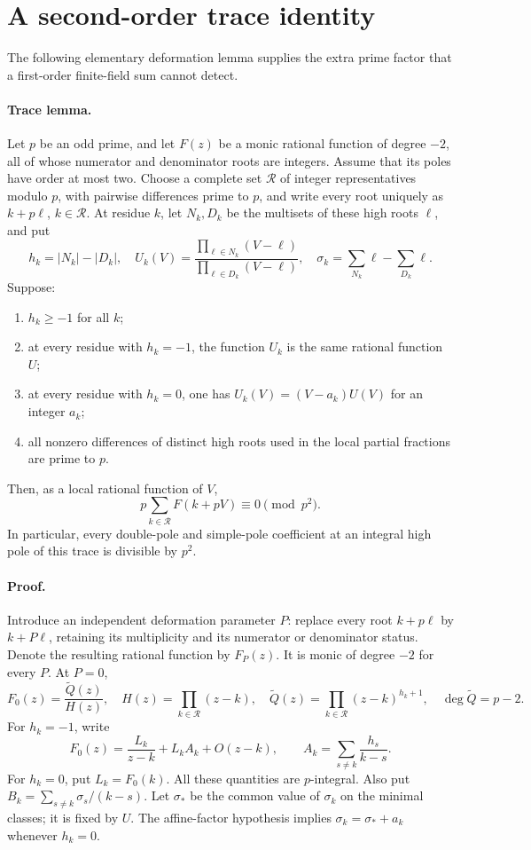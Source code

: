 \section{A second-order trace identity}
The following elementary deformation lemma supplies the extra prime
factor that a first-order finite-field sum cannot detect.

\paragraph{Trace lemma.}
Let $p$ be an odd prime, and let $F(z)$ be a monic rational function of
degree $-2$, all of whose numerator and denominator roots are integers.
Assume that its poles have order at most two.  Choose a complete set
$\mathcal R$ of integer representatives modulo $p$, with pairwise
differences prime to $p$, and write every root uniquely as $k+p\ell$,
$k\in\mathcal R$.  At residue $k$, let $N_k,D_k$ be the multisets of these
high roots $\ell$, and put
\[
 h_k=|N_k|-|D_k|,\quad
 U_k(V)=\frac{\prod_{\ell\in N_k}(V-\ell)}
                  {\prod_{\ell\in D_k}(V-\ell)},\quad
 \sigma_k=\sum_{N_k}\ell-\sum_{D_k}\ell.
\]
Suppose:
\begin{enumerate}
\item $h_k\ge-1$ for all $k$;
\item at every residue with $h_k=-1$, the function $U_k$ is the same
      rational function $U$;
\item at every residue with $h_k=0$, one has $U_k(V)=(V-a_k)U(V)$ for an
      integer $a_k$;
\item all nonzero differences of distinct high roots used in the local
      partial fractions are prime to $p$.
\end{enumerate}
Then, as a local rational function of $V$,
\[
       p\sum_{k\in\mathcal R}F(k+pV)\equiv0\pmod {p^2}.       \tag{T2}
\]
In particular, every double-pole and simple-pole coefficient at an
integral high pole of this trace is divisible by $p^2$.

\paragraph{Proof.}
Introduce an independent deformation parameter $P$: replace every root
$k+p\ell$ by $k+P\ell$, retaining its multiplicity and its numerator or
denominator status.  Denote the resulting rational function by $F_P(z)$.
It is monic of degree $-2$ for every $P$.  At $P=0$,
\[
 F_0(z)=\frac{\widetilde Q(z)}{H(z)},\quad
 H(z)=\prod_{k\in\mathcal R}(z-k),\quad
 \widetilde Q(z)=\prod_{k\in\mathcal R}(z-k)^{h_k+1},
 \quad\deg\widetilde Q=p-2.
\]
For $h_k=-1$, write
\[
 F_0(z)=\frac{L_k}{z-k}+L_k A_k+O(z-k),\qquad
 A_k=\sum_{s\ne k}\frac{h_s}{k-s}.
\]
For $h_k=0$, put $L_k=F_0(k)$.  All these quantities are $p$-integral.
Also put $B_k=\sum_{s\ne k}\sigma_s/(k-s)$.
Let $\sigma_*$ be the common value of $\sigma_k$ on the minimal classes;
it is fixed by $U$.  The affine-factor hypothesis implies
$\sigma_k=\sigma_*+a_k$ whenever $h_k=0$.

